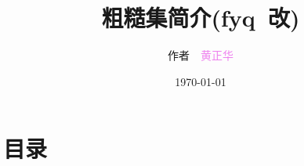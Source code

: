 \documentclass[notheorems,mathserif,table]{beamer}
\begin{document}
\newtheorem{theorem}{定理}
\newtheorem{definition}{定义}
\newtheorem{lemma}{引理}
\newtheorem{corollary}{推论}
\newtheorem{proposition}{性质}
\newtheorem{example}{例}
\newtheorem{remark}{注}

\renewcommand\figurename{\rm 图}
\renewcommand\tablename{\bf 表}
    \title{粗糙集简介(fyq~改)}
    \author[\textcolor{black}{\songti 作者~黄正华}]{\songti 作者~~\textcolor{violet}{黄正华}}
    \date{\today}
    \frame{ \titlepage }
    \section*{目录}
\end{document}
